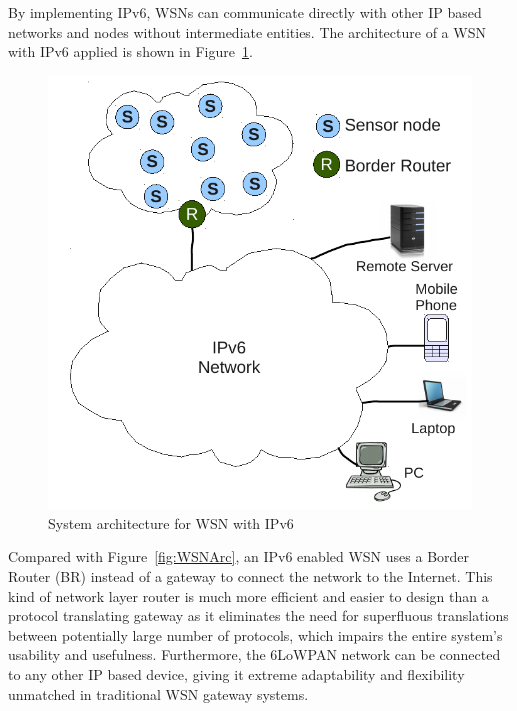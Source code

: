 By implementing IPv6, WSNs can communicate directly with other IP based networks and nodes without intermediate entities. The architecture of a WSN with IPv6 applied is shown in Figure~\ref{fig:Ipv6WSNArc}.
\begin{figure}[htbp]
  \begin{center}
    \leavevmode
      \includegraphics[scale=0.4]
      {Pics/Ipv6WSNArc.pdf}
   \caption{System architecture for WSN with IPv6}
    \label{fig:Ipv6WSNArc}
  \end{center}
\end{figure}

Compared with  Figure~\ref{fig:WSNArc}, an IPv6 enabled WSN uses a Border Router (BR) instead of a gateway  to connect the network to the Internet. This kind of network layer router is much more efficient and easier to design than a protocol translating gateway as it eliminates the need for superfluous translations between potentially large number of protocols, which impairs the entire system's usability and usefulness. Furthermore, the 6LoWPAN network can be connected to any other IP based device, giving it extreme adaptability and flexibility unmatched in traditional WSN gateway systems. 

